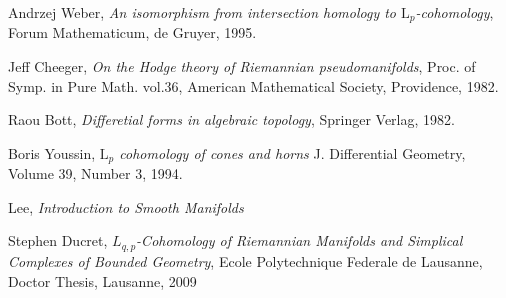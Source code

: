 \documentclass[licencjacka]{pracamgr}
\theoremstyle{definition}
\theoremstyle{definition}
\theoremstyle{plain}
\theoremstyle{plain}
\begin{document}
\begin{thebibliography}{99}

 Andrzej Weber, \textit{An isomorphism from
  intersection homology to $\mathrm{L}_p$-cohomology}, Forum
  Mathematicum, de Gruyer, 1995.
  
 Jeff Cheeger, \textit{On the Hodge theory
  of Riemannian pseudomanifolds}, Proc. of Symp. in Pure Math. vol.36,
  American Mathematical Society, Providence, 1982.

 Raou Bott, \textit{Differetial forms in algebraic
  topology}, Springer Verlag, 1982.

 Boris Youssin, \textit{$\mathrm{L}_p$
  cohomology of cones and horns } J. Differential Geometry, Volume 39,
  Number 3, 1994.
  
 Lee, \textit{Introduction to Smooth Manifolds}

 Stephen Ducret, \textit{$L_{q,p}$-Cohomology of Riemannian
    Manifolds and Simplical Complexes of Bounded Geometry}, Ecole Polytechnique Federale
    de Lausanne, Doctor Thesis, Lausanne, 2009

\end{thebibliography}
\end{document}

